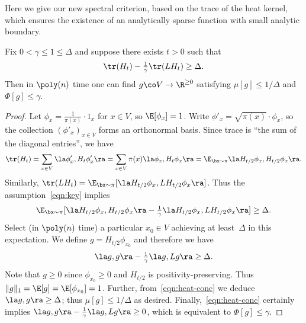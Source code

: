 \documentclass[11pt]{article}
\newcommand{\Bdry}{\Phi}
\newcommand{\Spars}{\mu}
\newcommand{\partsize}{\Delta}
\begin{document}
Here we give our new spectral criterion, based on the trace of the heat kernel, which ensures the existence of an analytically sparse function with small analytic boundary.
\begin{theorem}                                     \label{thm:heat-algorithm}
    Fix  $0 < \gamma \leq 1 \leq \partsize$ and suppose there exists $t > 0$ such that
    \begin{equation} \label{eqn:key}
        \tr(H_t) - \tfrac{1}{\gamma} \tr(LH_t) \geq \partsize.
    \end{equation}
    Then in $\poly(n)$ time one can find $g \co V \to \R^{\geq 0}$ satisfying $\Spars[g] \leq 1/\partsize$ and $\Bdry[g] \leq \gamma$.
\end{theorem}
\begin{proof}
    Let $\phi_x = \tfrac{1}{\pi(x)} \cdot 1_x$ for $x \in V$, so $\E[\phi_x]= 1$.  Write $\phi'_x = \sqrt{\pi(x)} \cdot \phi_x$, so the collection $(\phi'_x)_{x \in V}$ forms an orthonormal basis.  Since trace is ``the sum of the diagonal entries'', we have
    \[
        \tr(H_t) = \sum_{x \in V} \la \phi'_x, H_t \phi'_x \ra = \sum_{x \in V} \pi(x) \la \phi_x, H_t \phi_x \ra = \E_{\bx \sim \pi} \la H_{t/2} \phi_x, H_{t/2} \phi_x \ra.
    \]
    Similarly, $\tr(L H_t) = \E_{\bx \sim \pi}[ \la H_{t/2} \phi_x, L H_{t/2} \phi_x \ra]$.
    Thus the assumption~\eqref{eqn:key} implies
    \[
        \E_{\bx \sim \pi}[\la H_{t/2} \phi_x, H_{t/2} \phi_x \ra - \tfrac{1}{\gamma} \la H_{t/2} \phi_x, L H_{t/2} \phi_x \ra] \geq \partsize.
    \]
    Select (in $\poly(n)$ time) a particular $x_0 \in V$ achieving at least~$\partsize$ in this expectation.  We define $g = H_{t/2} \phi_{x_0}$ and therefore we have
    \begin{equation} \label{eqn:heat-conc}
        \la g, g \ra - \tfrac{1}{\gamma} \la g, L g \ra \geq \partsize.
    \end{equation}
    Note that $g \geq 0$ since $\phi_{x_0} \geq 0$ and $H_{t/2}$ is positivity-preserving.  Thus $\|g\|_1 = \E[g] = \E[\phi_{x_0}] = 1$.  Further, from~\eqref{eqn:heat-conc} we deduce $\la g, g \ra \geq \partsize$; thus $\Spars[g] \leq 1/\partsize$ as desired.  Finally,~\eqref{eqn:heat-conc} certainly implies $\la g, g \ra - \tfrac{1}{\gamma} \la g, L g \ra \geq 0$, which is equivalent to $\Bdry[g] \leq \gamma$.
\end{proof}
\end{document}
